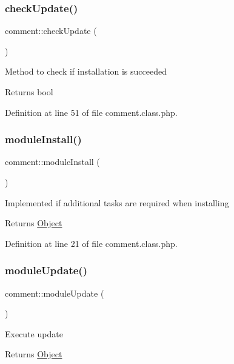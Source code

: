 \subsubsection{\texorpdfstring{check\+Update()}{checkUpdate()}}
{\footnotesize\ttfamily comment\+::check\+Update (\begin{DoxyParamCaption}{ }\end{DoxyParamCaption})}

Method to check if installation is succeeded \begin{DoxyReturn}{Returns}
bool 
\end{DoxyReturn}


Definition at line 51 of file comment.\+class.\+php.

\hypertarget{classcomment_a635989397982dcf8a45c9a374bf11aec}{}\label{classcomment_a635989397982dcf8a45c9a374bf11aec} 
\subsubsection{\texorpdfstring{module\+Install()}{moduleInstall()}}
{\footnotesize\ttfamily comment\+::module\+Install (\begin{DoxyParamCaption}{ }\end{DoxyParamCaption})}

Implemented if additional tasks are required when installing \begin{DoxyReturn}{Returns}
\hyperlink{classObject}{Object} 
\end{DoxyReturn}


Definition at line 21 of file comment.\+class.\+php.

\hypertarget{classcomment_abcf41a36b46e090d498f35a0df92edc0}{}\label{classcomment_abcf41a36b46e090d498f35a0df92edc0} 
\subsubsection{\texorpdfstring{module\+Update()}{moduleUpdate()}}
{\footnotesize\ttfamily comment\+::module\+Update (\begin{DoxyParamCaption}{ }\end{DoxyParamCaption})}

Execute update \begin{DoxyReturn}{Returns}
\hyperlink{classObject}{Object} 
\end{DoxyReturn}


